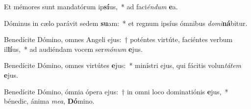 \item Et mémores sunt mandatórum ip\textbf{sí}us,~* ad faci\textit{én}\textit{dum} \textbf{e}a.
\item Dóminus in cælo parávit sedem \textbf{su}am:~* et regnum ipsíus ómnibus \textit{do}\textit{mi}\textbf{ná}bitur.
\item Benedícite Dómino, omnes Angeli ejus:~† poténtes virtúte, faciéntes verbum il\textbf{lí}us,~* ad audiéndam vocem ser\textit{mó}\textit{num} \textbf{e}jus.
\item Benedícite Dómino, omnes virtútes \textbf{e}jus:~* minístri ejus, qui fácitis volun\textit{tá}\textit{tem} \textbf{e}jus.
\item Benedícite Dómino, ómnia ópera ejus:~† in omni loco dominatiónis \textbf{e}jus,~* bénedic, ánima \textit{me}\textit{a}, \textbf{Dó}mino.
